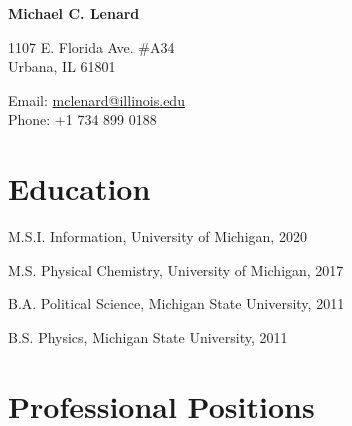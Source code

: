 \documentclass[12pt,letterpaper]{report}
\newcommand{\myname}{Michael C. Lenard}
\newcommand{\namefont}[1]{{\normalfont\bfseries\Huge{#1}}}
\begin{document}
 \raggedright

\namefont{\myname}

\vspace{1em}
\begin{minipage}[t]{0.68\textwidth}
        1107 E. Florida Ave. \#A34 \\
Urbana, IL 61801
\end{minipage}
\begin{minipage}[t]{0.31\textwidth}
        Email: \href{mailto:mclenard@illinois.edu}{mclenard@illinois.edu} \\
        Phone: +1 734 899 0188
\end{minipage}
\vspace{0.5em}



\section*{Education}

\begin{tablist}

	\item[M.S.I.] \tab Information, University of Michigan, 2020

	\item[M.S.]  \tab Physical Chemistry, University of Michigan, 2017

	\item[B.A.]  \tab Political Science, Michigan State University, 2011
        
	\item[B.S.]  \tab Physics, Michigan State University, 2011

\end{tablist}



\section*{Professional Positions}
\end{document}
